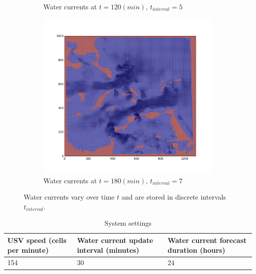 \documentclass{tamuccthesis}
\begin{document}
\begin{figure}
\begin{subfigure}[b]{0.475\textwidth}
        \caption{{\small Water currents at $t = 120 (min)$, $t_{interval} = 5$}}   
        \label{fig:currents_interval_5}
    \end{subfigure}
    \quad
    \begin{subfigure}[b]{0.475\textwidth}   
        \centering 
        \includegraphics[width=\textwidth,trim={3cm 3cm 3cm 3cm},clip]{Fig_currentsMap-7.png}
        \caption[interval 7]%
        {{\small Water currents at $t = 180 (min)$, $t_{interval} = 7$}}   
        \label{fig:currents_interval_7}
    \end{subfigure}
    \caption[Dynamic water currents.]{Water currents vary over time $t$ and are stored in discrete intervals $t_{interval}$.} 
    \label{fig:currents_intervals}
\end{figure}

\begin{table}[H]\small
    \begin{tabular}{|l|l|l|}
    \hline
    USV speed (cells per minute) & Water current update interval (minutes) & Water current forecast duration (hours) \\
    \hline
    154                 & 30                                      & 24 \\
    \hline
    \end{tabular}
    \caption{System settings}
    \label{sys_settings}
\end{table}
\end{document}
